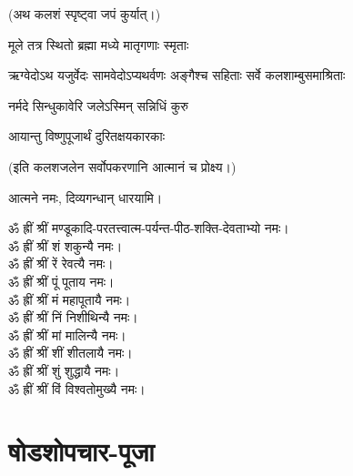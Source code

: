 (अथ कलशं स्पृष्ट्वा जपं कुर्यात्।)

{मूले तत्र स्थितो ब्रह्मा मध्ये मातृगणाः स्मृताः}

{ऋग्वेदोऽथ यजुर्वेदः सामवेदोऽप्यथर्वणः}
{अङ्गैश्च सहिताः सर्वे कलशाम्बुसमाश्रिताः}

{नर्मदे सिन्धुकावेरि जलेऽस्मिन् सन्निधिं कुरु}

{आयान्तु विष्णुपूजार्थं दुरितक्षयकारकाः}


(इति कलशजलेन सर्वोपकरणानि आत्मानं च प्रोक्ष्य।)

आत्मने नमः, दिव्यगन्धान् धारयामि। 



ॐ ह्रीं श्रीं मण्डूकादि-परतत्त्वात्म-पर्यन्त-पीठ-शक्ति-देवताभ्यो नमः।\\
ॐ ह्रीं श्रीं शं शकुन्यै नमः।\\
ॐ ह्रीं श्रीं रें रेवत्यै नमः।\\
ॐ ह्रीं श्रीं पूं पूताय नमः।\\
ॐ ह्रीं श्रीं मं महापूतायै नमः।\\
ॐ ह्रीं श्रीं निं निशीथिन्यै नमः।\\
ॐ ह्रीं श्रीं मां मालिन्यै नमः।\\
ॐ ह्रीं श्रीं शीं शीतलायै नमः।\\
ॐ ह्रीं श्रीं शुं शुद्धायै नमः।\\
ॐ ह्रीं श्रीं विं विश्वतोमुख्यै नमः।\\




\section{षोडशोपचार-पूजा}
\renewcommand{\devAya}{श्री-वल्ली-देवसेना-समेत-सुब्रह्मण्य-स्वामिने नमः,}

